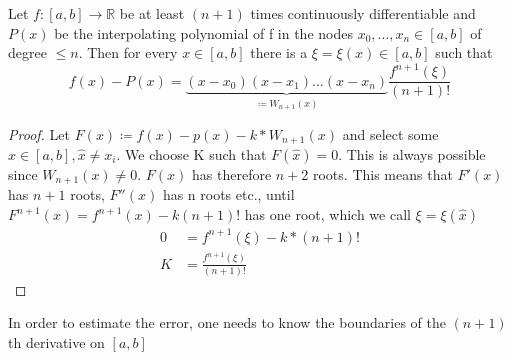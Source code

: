 \begin{theorem}
    Let $f:[a,b] \to \mathbb{R}$ be at least $(n+1)$ times continuously differentiable and $P(x)$ be the interpolating polynomial of f in the nodes
    $x_0, \ldots, x_n \in [a,b]$ of degree $\leq n$. Then for every $x \in [a,b]$ there is a $\xi = \xi(x) \in [a,b]$ such that
    \begin{equation*}
        f(x)-P(x) = \underbrace{(x-x_0)(x-x_1)\ldots(x-x_n)}_{\coloneq W_{n+1}(x)}\frac{f^{n+1}(\xi)}{(n+1)!}
    \end{equation*}
\end{theorem}
\begin{proof}
    Let $F(x) \coloneq f(x)-p(x)-k*W_{n+1}(x)$ and select some $\hat{x}\in [a,b], \hat{x} \neq x_i$.
    We choose K such that $F(\hat{x})=0$.
    This is always possible since $W_{n+1}(x) \neq 0$. $F(x)$ has therefore $n+2$ roots.
    This means that $F'(x)$ has $n+1$ roots, $F''(x)$ has n roots etc., until $F^{n+1}(x)= f^{n+1}(x)-k(n+1)!$ has one root,
    which we call $\xi = \xi(\hat{x})$
    \begin{align*}
        0 &= f^{n+1}(\xi)-k*(n+1)! \\
        K &= \frac{f^{n+1}(\xi)}{(n+1)!}
    \end{align*}
\end{proof}
\begin{remark}
    In order to estimate the error, one needs to know the boundaries of the $(n+1)$th derivative on $[a,b]$
\end{remark}

